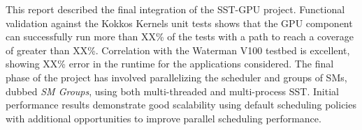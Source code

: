 This report described the final integration of the SST-GPU project.
Functional validation against the Kokkos Kernels unit tests shows that the GPU
component can successfully run more than XX\% of the tests with a path to reach
a coverage of greater than XX\%. Correlation with the Waterman V100 testbed is
excellent, showing XX\% error in the runtime for the applications considered.
The final phase of the project has involved parallelizing the scheduler and
groups of SMs, dubbed {\em SM Groups}, using both multi-threaded and
multi-process SST. Initial performance results demonstrate good scalability
using default scheduling policies with additional opportunities to improve
parallel scheduling performance.
